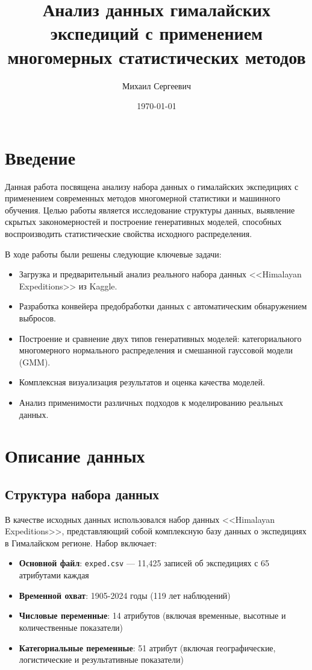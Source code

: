\documentclass[12pt, a4paper]{article}
\title{Анализ данных гималайских экспедиций с применением многомерных статистических методов}
\author{Михаил Сергеевич}
\date{\today}
\begin{document}
\maketitle
\thispagestyle{empty}
\newpage

\tableofcontents
\newpage

\section{Введение}
Данная работа посвящена анализу набора данных о гималайских экспедициях с применением современных методов многомерной статистики и машинного обучения. Целью работы является исследование структуры данных, выявление скрытых закономерностей и построение генеративных моделей, способных воспроизводить статистические свойства исходного распределения.

В ходе работы были решены следующие ключевые задачи:
\begin{itemize}
    \item Загрузка и предварительный анализ реального набора данных <<Himalayan Expeditions>> из Kaggle.
    \item Разработка конвейера предобработки данных с автоматическим обнаружением выбросов.
    \item Построение и сравнение двух типов генеративных моделей: категориального многомерного нормального распределения и смешанной гауссовой модели (GMM).
    \item Комплексная визуализация результатов и оценка качества моделей.
    \item Анализ применимости различных подходов к моделированию реальных данных.
\end{itemize}

\section{Описание данных}
\subsection{Структура набора данных}
В качестве исходных данных использовался набор данных <<Himalayan Expeditions>>, представляющий собой комплексную базу данных о экспедициях в Гималайском регионе. Набор включает:

\begin{itemize}
    \item \textbf{Основной файл}: \texttt{exped.csv} --- 11,425 записей об экспедициях с 65 атрибутами каждая
    \item \textbf{Временной охват}: 1905-2024 годы (119 лет наблюдений)
    \item \textbf{Числовые переменные}: 14 атрибутов (включая временные, высотные и количественные показатели)
    \item \textbf{Категориальные переменные}: 51 атрибут (включая географические, логистические и результативные показатели)
\end{itemize}
\end{document}
